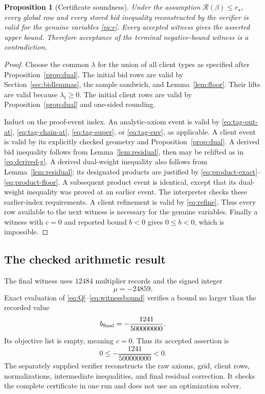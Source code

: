 \documentclass[11pt]{article}
\numberwithin{equation}{section}
\newtheorem{proposition}[theorem]{Proposition}
\theoremstyle{definition}
\newcommand{\calR}{\mathcal R}
\newcommand{\rstar}{r_\star}
\newcommand{\efile}[1]{\texttt{\detokenize{#1}}}
\begin{document}
\begin{proposition}[Certificate soundness]\label{prop:soundness}
Under the assumption $\calR(\beta)\le\rstar$, every global row and every
stored bid inequality reconstructed by the verifier is valid for the genuine
variables \eqref{eq:v}. Every accepted witness gives the asserted upper
bound. Therefore acceptance of the terminal negative-bound witness is a
contradiction.
\end{proposition}
\begin{proof}
Choose the common $\lambda$ for the union of all client types as specified
after Proposition~\ref{prop:dual}. The initial bid rows are valid by
Section~\ref{sec:bidlemmas}, the sample sandwich, and
Lemma~\ref{lem:floor}. Their lifts are valid because $\lambda_t\ge0$.
The initial client rows are valid by Proposition~\ref{prop:dual} and
one-sided rounding.

Induct on the proof-event index. An analytic-axiom event is valid by
\eqref{eq:tag-out-at}, \eqref{eq:tag-chain-at},
\eqref{eq:tag-super}, or \eqref{eq:tag-env}, as applicable.
A client event is valid by its explicitly checked geometry and
Proposition~\ref{prop:dual}. A derived bid inequality follows from
Lemma~\ref{lem:residual}, then may be relifted as in
\eqref{eq:derived-g}. A derived dual-weight inequality also follows from
Lemma~\ref{lem:residual}; its designated products are justified by
\eqref{eq:product-exact}--\eqref{eq:product-floor}. A subsequent product
event is identical, except that its dual-weight inequality was proved at an
earlier event. The interpreter checks these earlier-index requirements.
A client refinement is valid by \eqref{eq:refine}.
Thus every row available to the next witness is necessary for the genuine
variables. Finally a witness with $c=0$ and reported bound $b<0$ gives
$0\le b<0$, which is impossible.
\end{proof}

\subsection{The checked arithmetic result}
The final witness uses $12484$ multiplier records and the signed integer
\[
 \mu=-24859.
\]
Exact evaluation of \eqref{eq:Q}--\eqref{eq:witnessbound} verifies a bound
no larger than the recorded value
\begin{equation}\label{eq:negative}
 b_{\rm final}=-\frac{1241}{500000000}.
\end{equation}
Its objective list is empty, meaning $c=0$. Thus its accepted assertion is
\[
 0\le-\frac{1241}{500000000}<0.
\]
The separately supplied verifier \efile{verify.py} reconstructs the raw axioms,
grid, client rows, normalizations, intermediate inequalities, and final
residual correction.
It checks the complete certificate in one run and does not use an
optimization solver.
\end{document}
